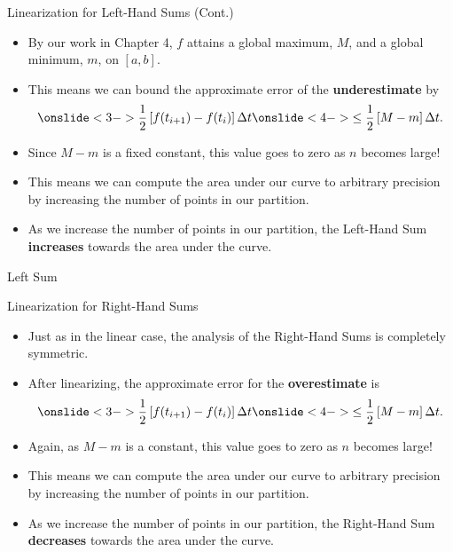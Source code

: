 \documentclass[Lecture.tex]{subfiles}
\begin{document}
\begin{frame}{Linearization for Left-Hand Sums (Cont.)}
  \begin{itemize}
  \item<1->
    By our work in Chapter 4, $f$ attains a global maximum, $M$, and a global minimum, $m$, on $[a,b]$. 
  \item<2->
    This means we can bound the approximate error of the {\bf underestimate} by
    $$\onslide<3->{\frac{1}{2}\left[f(t_{i+1}) - f(t_i)\right]\Delta t} \onslide<4->{ \leq \frac{1}{2}\left[M - m\right]\Delta t.}$$
  \item<5->
    Since $M - m$ is a fixed constant, this value goes to zero as $n$ becomes large!
  \item<6->
    This means we can compute the area under our curve to arbitrary precision by increasing the number of points in our partition.
  \item<7->
    As we increase the number of points in our partition, the Left-Hand Sum {\bf increases} towards the area under the curve.
  \end{itemize}
\end{frame}

\begin{frame}{Left Sum}
\end{frame}

\begin{frame}{Linearization for Right-Hand Sums}
  \begin{itemize}
  \item<1->
    Just as in the linear case, the analysis of the Right-Hand Sums is completely symmetric.
  \item<2->
    After linearizing, the approximate error for the {\bf overestimate} is 
    $$\onslide<3->{\frac{1}{2}\left[f(t_{i+1}) - f(t_i)\right]\Delta t} \onslide<4->{ \leq \frac{1}{2}\left[M - m\right]\Delta t.}$$
  \item<5->
    Again, as $M - m$ is a constant, this value goes to zero as $n$ becomes large!
  \item<6->
    This means we can compute the area under our curve to arbitrary precision by increasing the number of points in our partition.
  \item<7->
    As we increase the number of points in our partition, the Right-Hand Sum {\bf decreases} towards the area under the curve.
  \end{itemize}
\end{frame}
\end{document}
